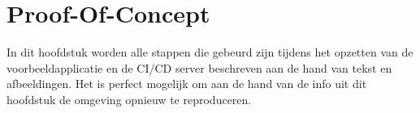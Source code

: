 \section{Proof-Of-Concept}
\label{sec:proof-of-concept}
In dit hoofdstuk worden alle stappen die gebeurd zijn tijdens het opzetten van de voorbeeldapplicatie en de CI/CD server beschreven aan de hand van tekst en afbeeldingen. Het is perfect mogelijk om aan de hand van de info uit dit hoofdstuk de omgeving opnieuw te reproduceren.